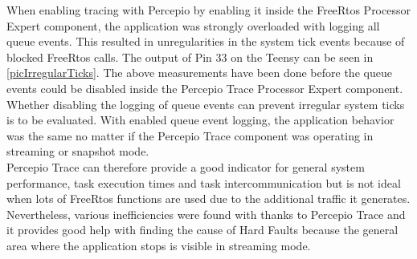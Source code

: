 When enabling tracing with Percepio by enabling it inside the FreeRtos Processor Expert component, the application was strongly overloaded with logging all queue events. This resulted in unregularities in the system tick events because of blocked FreeRtos calls. The output of Pin 33 on the Teensy can be seen in \autoref{picIrregularTicks}.
The above measurements have been done before the queue events could be disabled inside the Percepio Trace Processor Expert component. Whether disabling the logging of queue events can prevent irregular system ticks is to be evaluated. With enabled queue event logging, the application behavior was the same no matter if the Percepio Trace component was operating in streaming or snapshot mode.\\
Percepio Trace can therefore provide a good indicator for general system performance, task execution times and task intercommunication but is not ideal when lots of FreeRtos functions are used due to the additional traffic it generates.\\
Nevertheless, various inefficiencies were found with thanks to Percepio Trace and it provides good help with finding the cause of Hard Faults because the general area where the application stops is visible in streaming mode.\\
%
%
